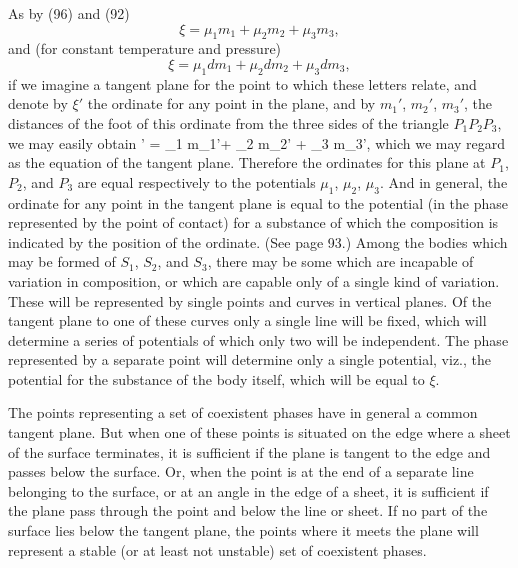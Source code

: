 \documentclass[12pt]{memoir}
\begin{document}
As by (96) and (92)
$$\xi= \mu_1 m_1+ \mu_2 m_2 +  \mu_3 m_3,$$
and (for constant temperature and pressure)
$$\xi= \mu_1 d m_1+ \mu_2 d m_2 +  \mu_3 d m_3,$$
if we imagine a tangent plane for the point to which these letters relate, and denote by $\xi'$ the ordinate for any point in the plane, and by $m_1'$, $m_2'$, $m_3'$, the distances of the foot of this ordinate from the three sides of the triangle $P_1 P_2 P_3$, we may easily obtain
\eqs
\xi' = \mu_1 m_1'+ \mu_2 m_2' +  \mu_3 m_3',
\label{199}\eqe
which we may regard as the equation of the tangent plane. Therefore the ordinates for this plane at $P_1$, $P_2$, and $P_3$ are equal respectively to the potentials $\mu_1$, $\mu_2$, $\mu_3$. And in general, the ordinate for any point in the tangent plane is equal to the potential (in the phase represented by the point of contact) for a substance of which the composition is indicated by the position of the ordinate. (See page 93.) Among the bodies which may be formed of $S_1$, $S_2$, and $S_3$, there may be some which are incapable of variation in composition, or which are capable only of a single kind of variation. These will be represented by single points and curves in vertical planes. Of the tangent plane to one of these curves only a single line will be fixed, which will determine a series of potentials of which only two will be independent. The phase represented by a separate point will determine only a single potential, viz., the potential for the substance of the body itself, which will be equal to $\xi$.


The points representing a set of coexistent phases have in general a common tangent plane. But when one of these points is situated on the edge where a sheet of the surface terminates, it is sufficient if the plane is tangent to the edge and passes below the surface. Or, when the point is at the end of a separate line belonging to the surface, or at an angle in the edge of a sheet, it is sufficient if the plane pass through the point and below the line or sheet. If no part of the surface lies below the tangent plane, the points where it meets the plane will represent a stable (or at least not unstable) set of coexistent phases.
\end{document}
